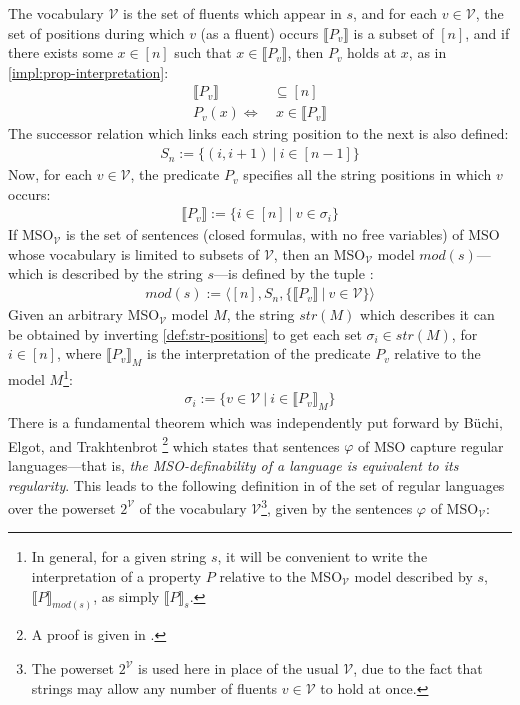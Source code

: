 \documentclass[a4paper,12pt,leqno]{article}
\newcommand{\V}{\mathcal{V}}
\renewcommand{\phi}{\varphi}
\begin{document}
The vocabulary $\V$ is the set of fluents which appear in $s$, and for each $v \in \V$, the set of positions during which $v$ (as a fluent) occurs $\llbracket P_v \rrbracket$ is a subset of $[n]$, and if there exists some $x \in [n]$ such that $x \in \llbracket P_v \rrbracket$, then $P_v$ holds at $x$, as in \cref{impl:prop-interpretation}:
\begin{align}
	\llbracket P_v \rrbracket &\subseteq [n]\\
	P_v(x) \Longleftrightarrow& ~x \in \llbracket P_v \rrbracket
\end{align}
The successor relation which links each string position to the next is also defined:
\begin{align}
	S_n := \{(i, i+1) ~|~ i \in [n - 1]\}
\end{align}
Now, for each $v \in \V$, the predicate $P_v$ specifies all the string positions in which $v$ occurs:
\begin{align}\label{def:str-positions}
	\llbracket P_v \rrbracket := \{i \in [n] ~|~ v \in \sigma_i\}
\end{align}
If MSO$_{\V}$ is the set of sentences (closed formulas, with no free variables) of MSO whose vocabulary is limited to subsets of $\V$, then an MSO$_{\V}$ model $mod(s)$---which is described by the string $s$---is defined by the tuple \citep{fernando2016regular}:
\begin{align}
	mod(s) := \langle [n], S_n, \{\llbracket P_v \rrbracket ~|~ v \in \V\} \rangle
\end{align}
Given an arbitrary MSO$_{\V}$ model $M$, the string $str(M)$ which describes it can be obtained by inverting \cref{def:str-positions} to get each set $\sigma_i \in str(M)$, for $i \in [n]$, where $\llbracket P_v \rrbracket_M$ is the interpretation of the predicate $P_v$ relative to the model $M$\footnote{In general, for a given string $s$, it will be convenient to write the interpretation of a property $P$ relative to the MSO$_{\V}$ model described by $s$, $\llbracket P \rrbracket_{mod(s)}$, as simply $\llbracket P \rrbracket_s$.}:
\begin{align}
	\sigma_i := \{v \in \V ~|~ i \in \llbracket P_v \rrbracket_M \}
\end{align}
There is a fundamental theorem which was independently put forward by B\"{u}chi, Elgot, and Trakhtenbrot \cite[p. 30]{fernando2016regular}\footnote{A proof is given in \citet[p.124, Theorem 7.21]{Libkin2004}.} which states that sentences $\phi$ of MSO capture regular languages---that is, \textit{the MSO-definability of a language is equivalent to its regularity}. This leads to the following definition in \citet[p. 35]{Fernando2018} of the set of regular languages over the powerset $2^{\V}$ of the vocabulary $\V$\footnote{The powerset $2^{\V}$ is used here in place of the usual $\V$, due to the fact that strings may allow any number of fluents $v \in \V$ to hold at once.}, given by the sentences $\phi$ of MSO$_{\V}$:
\end{document}
